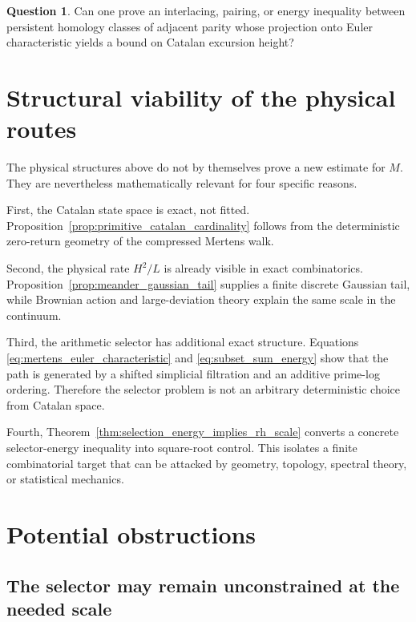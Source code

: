 \documentclass[11pt]{amsart}
\numberwithin{equation}{section}
\theoremstyle{plain}
\theoremstyle{definition}
\newtheorem{question}[theorem]{Question}
\theoremstyle{remark}
\newcommand{\Mert}{M}
\begin{document}
\begin{question}
\label{question:persistent_parity}
Can one prove an interlacing, pairing, or energy inequality between persistent homology classes of adjacent parity whose projection onto Euler characteristic yields a bound on Catalan excursion height?
\end{question}

\section{Structural viability of the physical routes}
\label{sec:not_vacuous}

The physical structures above do not by themselves prove a new estimate for $\Mert$.  They are nevertheless mathematically relevant for four specific reasons.

First, the Catalan state space is exact, not fitted.  Proposition~\ref{prop:primitive_catalan_cardinality} follows from the deterministic zero-return geometry of the compressed Mertens walk.

Second, the physical rate $H^2/L$ is already visible in exact combinatorics.  Proposition~\ref{prop:meander_gaussian_tail} supplies a finite discrete Gaussian tail, while Brownian action and large-deviation theory explain the same scale in the continuum.

Third, the arithmetic selector has additional exact structure.  Equations \eqref{eq:mertens_euler_characteristic} and \eqref{eq:subset_sum_energy} show that the path is generated by a shifted simplicial filtration and an additive prime-log ordering.  Therefore the selector problem is not an arbitrary deterministic choice from Catalan space.

Fourth, Theorem~\ref{thm:selection_energy_implies_rh_scale} converts a concrete selector-energy inequality into square-root control.  This isolates a finite combinatorial target that can be attacked by geometry, topology, spectral theory, or statistical mechanics.

\section{Potential obstructions}
\label{sec:potential_obstructions}

\subsection{The selector may remain unconstrained at the needed scale}
\label{subsec:obstruction_selector}
\end{document}
